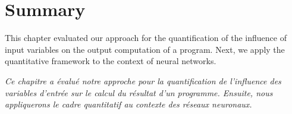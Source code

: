 \section{Summary}

This chapter evaluated our approach for the quantification of the influence of input variables on the output computation of a program. Next, we apply the quantitative framework to the context of neural networks.

\emph{Ce chapitre a évalué notre approche pour la quantification de l'influence des variables d'entrée sur le calcul du résultat d'un programme. Ensuite, nous appliquerons le cadre quantitatif au contexte des réseaux neuronaux.}
